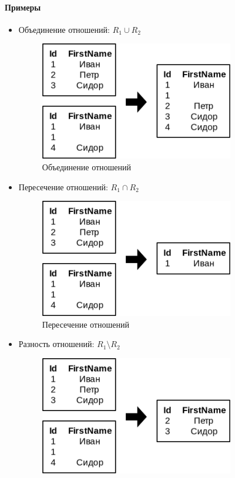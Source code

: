 \paragraph{Примеры}
\begin{itemize}
	\item Объединение отношений: $R_1 \cup R_2$
	      \begin{figure}[H]
		      \centering
		      \includegraphics[width=0.8\textwidth]{../assets/kgeorgiy/relalgebra/Set_Union_2.svg.png}
		      \caption{Объединение отношений}
		      \label{set-union-ex}
	      \end{figure}
	\item Пересечение отношений: $R_1 \cap R_2$
	      \begin{figure}[H]
		      \centering
		      \includegraphics[width=0.8\textwidth]{../assets/kgeorgiy/relalgebra/Set_Intersect_2.svg.png}
		      \caption{Пересечение отношений}
		      \label{set-intersect-ex}
	      \end{figure}
	\item Разность отношений: $R_1 \setminus R_2$
	      \begin{figure}[H]
		      \centering
		      \includegraphics[width=0.8\textwidth]{../assets/kgeorgiy/relalgebra/Set_Minus_2.svg.png}

\end{figure}
\end{itemize}
